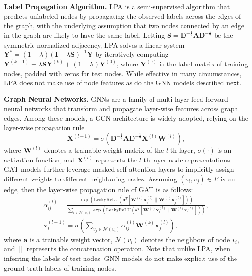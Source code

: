 \documentclass[sigconf,screen,nonacm]{acmart} \usepackage{booktabs}
\newcommand{\bs}{\boldsymbol}
\newcommand{\ba}{\bs{a}}
\newcommand{\bA}{\bs{A}}
\newcommand{\bD}{\bs{D}}
\newcommand{\bI}{\bs{I}}
\newcommand{\bS}{\bs{S}}
\newcommand{\bW}{\bs{W}}
\newcommand{\bx}{\bs{x}}
\newcommand{\bX}{\bs{X}}
\newcommand{\bY}{\bs{Y}}
\newcommand{\minisection}[1]{\vspace{5pt}\noindent\textbf{#1.}}
\begin{document}
	\minisection{Label Propagation Algorithm}
	LPA is a semi-supervised algorithm that predicts unlabeled nodes by propagating the observed labels across the edges of the graph, with the underlying assumption that two nodes connected by an edge in the graph are likely to have the same label.
	Letting $\bS=\bD^{-\frac12}\bA\bD^{-\frac12}$ be the symmetric normalized adjacency, LPA solves a linear system $\bY^*=(1-\lambda)(\bI-\lambda \bS)^{-1}\bY$ by iteratively computing $\bY^{(k+1)}=\lambda \bS\bY^{(k)}+(1-\lambda)\bY^{(0)}$, where $\bY^{(0)}$ is the label matrix of training nodes, padded with zeros for test nodes.
While effective in many circumstances, LPA does not make use of node features as do the GNN models described next.
	


	\minisection{Graph Neural Networks}
	GNNs are a family of multi-layer feed-forward neural networks that transform and propagate layer-wise features across graph edges.
	Among these models, a GCN architecture is widely adopted, relying on the layer-wise propagation rule
	\begin{equation}
		\label{eqn:gcn}
		\bX^{(l+1)}=\sigma ( \bD^{-\frac12}\bA\bD^{-\frac12}\bX^{(l)}\bW^{(l)}),
	\end{equation}
	where $\bW^{(l)}$ denotes a trainable weight matrix of the $l$-th layer, $\sigma(\cdot)$ is an activation function, and $\bX^{(l)}$ represents the $l$-th layer node representations.
	GAT models further leverage masked self-attention layers to implicitly assign different weights to different neighboring nodes.
	Assuming $(v_i, v_j)\in E$ is an edge, then the layer-wise propagation rule of GAT is as follows:
    \begin{equation}
\label{eqn:gat}
		\begin{gathered}
\alpha_{ij}^{(l)}=\frac{\exp\left(\mathrm{LeakyReLU}\left(\ba^T[\bW^{(l)}\bx_i^{(l)}\parallel \bW^{(l)} \bx_j^{(l)}]\right)\right)}{\sum_{r\in\mathcal{N}(v_i)}\exp\left(\mathrm{LeakyReLU}\left(\ba^T[\bW^{(l)} \bx_i^{(l)}\parallel \bW^{(l)} \bx_r^{(l)}]\right)\right)},\\
		\bx^{(l+1)}_i=\sigma\left(\sum_{v_j\in \mathcal{N}(v_i)}\alpha^{(l)}_{ij}\bW^{(k)}\bx^{(l)}_j\right),
        \end{gathered}
\end{equation}
where $\ba$ is a trainable weight vector, $\mathcal{N}(v_i)$ denotes the neighbors of node $v_i$, and $\parallel$ represents the concatenation operation.  Note that unlike LPA, when inferring the labels of test nodes, GNN models do not make explicit use of the ground-truth labels of training nodes.
	
\end{document}
